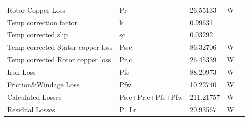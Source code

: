 \begin{table}[]
\begin{tabular}{
    >{\columncolor[HTML]{9B9B9B}}l llll}
    Rotor   Copper Loss                                 & Pr                                        & 26.55133                          & W                            &  \\
    Temp   correction factor                            & \cellcolor[HTML]{F2F2F2}k                 & \cellcolor[HTML]{F2F2F2}0.99631   & \cellcolor[HTML]{F2F2F2}     &  \\
    Temp corrected   slip                               & sc                                        & 0.03292                           &                              &  \\
    Temp   corrected Stator copper loss                 & \cellcolor[HTML]{F2F2F2}Ps,c              & \cellcolor[HTML]{F2F2F2}86.32706  & \cellcolor[HTML]{F2F2F2}W    &  \\
    Temp   corrected Rotor copper loss                  & Pr,c                                      & 26.45339                          & W                            &  \\
    Iron Loss                                           & \cellcolor[HTML]{F2F2F2}Pfe               & \cellcolor[HTML]{F2F2F2}88.20973  & \cellcolor[HTML]{F2F2F2}W    &  \\
    Friction\&Windage   Loss                            & Pfw                                       & 10.22740                          & W                            &  \\
    Calculated   Losses                                 & \cellcolor[HTML]{F2F2F2}Ps,c+Pr,c+Pfe+Pfw & \cellcolor[HTML]{F2F2F2}211.21757 & \cellcolor[HTML]{F2F2F2}W    &  \\
    Residual   Losses                                   & P\_Lr                                     & 20.93567                          & W                            & 
\end{tabular}
\end{table}

